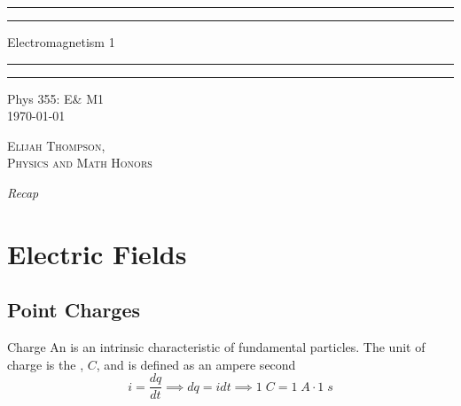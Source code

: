 \documentclass[12pt]{report}
\begin{document}

\begin{titlepage}
    \centering
    \scshape
    \vspace*{\baselineskip}
    \rule{\textwidth}{1.6pt}\vspace*{-\baselineskip}\vspace*{2pt}
    \rule{\textwidth}{0.4pt}
    
    \vspace{0.75\baselineskip}
    
    {\LARGE Electromagnetism 1}
    
    \vspace{0.75\baselineskip}
    
    \rule{\textwidth}{0.4pt}\vspace*{-\baselineskip}\vspace{3.2pt}
    \rule{\textwidth}{1.6pt}
    
    \vspace{2\baselineskip}
    Phys 355: E\& M1 \\
    \vspace*{3\baselineskip}
    \monthdayyeardate\today \\
    \vspace*{5.0\baselineskip}
    
    {\scshape\Large Elijah Thompson, \\ Physics and Math Honors\\}
    
    \vspace{1.0\baselineskip}
    \textit{Recap}
\end{titlepage}

\tableofcontents


\chapter{Electric Fields}

\section{Point Charges}

\begin{defn}{Charge}{}
	An  is an intrinsic characteristic of fundamental particles. The unit of charge is the , $C$, and is defined as an ampere second \begin{equation}
		i = \frac{dq}{dt} \implies dq = idt \implies 1\;C = 1\;A\cdot 1\;s
	\end{equation}
\end{defn}
\end{document}
